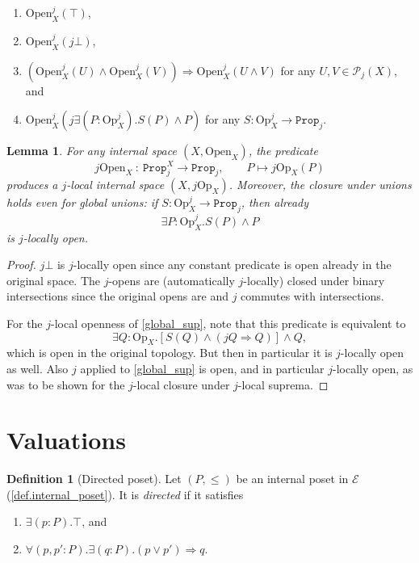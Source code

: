 \documentclass[11pt, oneside, article]{memoir}
\theoremstyle{plain}
\newtheorem{lemma}[theorem]{Lemma}
\theoremstyle{definition}
\newtheorem{definition}[theorem]{Definition}
\theoremstyle{remark}
\newcommand{\const}[1]{\mathtt{#1}}
\newcommand{\Set}[1]{\mathrm{#1}}
\newcommand{\cat}[1]{\mathcal{#1}}
\newcommand{\pow}{\mathcal{P}}
\newcommand{\prop}{\const{Prop}}
\newcommand{\Op}{\Set{Op}}
\newcommand{\Open}{\Set{Open}}
\newcommand{\imp}{\Rightarrow}
\begin{document}
\begin{enumerate}
	\item $\Open_X^j(\top)$,
	\item $\Open_X^j(j\bot)$,
	\item $(\Open_X^j(U)\wedge\Open_X^j(V))\imp \Open_X^j(U\wedge V)$ for any $U,V\in\pow_j(X)$, and
	\item $\Open_X^j(j\exists(P:\Op_X^j).S(P)\wedge P)$ for any $S\colon\Op_X^j\to\prop_j$. 
\end{enumerate}

\begin{lemma}
	\label{space_localize}
	For any internal space $(X,\Open_X)$, the predicate
	\[
		j \Open_X \: : \: \prop_j^X \longrightarrow \prop_j, \qquad P \longmapsto j \Op_X(P)
	\]
	produces a $j$-local internal space $(X,j \Op_X)$. Moreover, the closure under unions holds even for global unions: if $S : \Op_X^j \to \prop_j$, then already
	\begin{equation}
		\label{global_sup}
		\exists P : \Op_X^j . S(P) \land P
	\end{equation}
	is $j$-locally open.
\end{lemma}

\begin{proof}
	$j\bot$ is $j$-locally open since any constant predicate is open already in the original space.	The $j$-opens are (automatically $j$-locally) closed under binary intersections since the original opens are and $j$ commutes with intersections. 

	For the $j$-local openness of \eqref{global_sup}, note that this predicate is equivalent to
	\[
		\exists Q : \Op_X . \left[ S(Q) \land (jQ \imp  Q) \right] \land Q,
	\]
	which is open in the original topology. But then in particular it is $j$-locally open as well. Also $j$ applied to \eqref{global_sup} is open, and in particular $j$-locally open, as was to be shown for the $j$-local closure under $j$-local suprema.
\end{proof}

\section{Valuations}\label{sec.valuations}

\begin{definition}[Directed poset]\label{def.directed}
Let $(P,\leq)$ be an internal poset in $\cat{E}$ (\cref{def.internal_poset}). It is \emph{directed} if it satisfies
\begin{enumerate}
	\item $\exists(p:P).\top$, and
	\item $\forall(p,p':P).\exists(q:P).(p\vee p')\imp q$.
\end{enumerate}
\end{definition}
\end{document}
